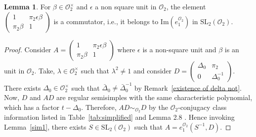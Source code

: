 \documentclass[10pt,twoside]{amsart}
\newcommand{\SL}{\mathrm{SL}}
\newcommand{\im}{\mathrm{Im}}
\newcommand{\R}{\mathcal{O}_2}
\theoremstyle{definition}
\theoremstyle{definition}
\newtheorem{lemma}[theorem]{Lemma}
\begin{document}
\begin{lemma}{\label{lift I}}
For $\beta\in \R^{\times}$ and $\epsilon$ a non square unit in $\R$, the element $ \left(\begin{array}{cc} 1 & \pi_2\epsilon\beta \\  \pi_2\beta &1 \end{array}\right)$ is a commutator, i.e., it belongs to $\im(e_1^{\R})$ in $\SL_2(\R)$. 
\end{lemma}
\begin{proof}
Consider  $A= \left(\begin{array}{cc} 1 & \pi_2\epsilon\beta \\  \pi_2\beta & 1 \end{array} \right)$ where $\epsilon$ is a non-square unit and $\beta$ is an unit in $\R$. Take, $\lambda\in \R^{\times}$ such that $\lambda^2\neq 1$ and consider $D = \left(\begin{array}{cc} \Delta_0  &  \pi_2 \\ 0& \Delta_0^{-1} \end{array}\right)$. There exists  $\Delta_0 \in \R^{\times}$ such that $\bar \Delta_0 \neq \bar\Delta_0^{-1}$ by Remark~\ref{existence of delta not}. Now, $D$ and $AD$ are regular semisimples with the same characteristic polynomial, which has a factor $t -\Delta_0$. Therefore, $AD \sim_{\R} D$ by the $\R$-conjugacy class information listed in Table~\ref{tab:simplified} and Lemma 2.8 \cite{PanjaRoySingh2025}. Hence invoking Lemma~\ref{sim1}, there exists $S\in \SL_2(\R)$ such that $A=e_1^{\R}(S^{-1}, D)$.
\end{proof}
\end{document}

